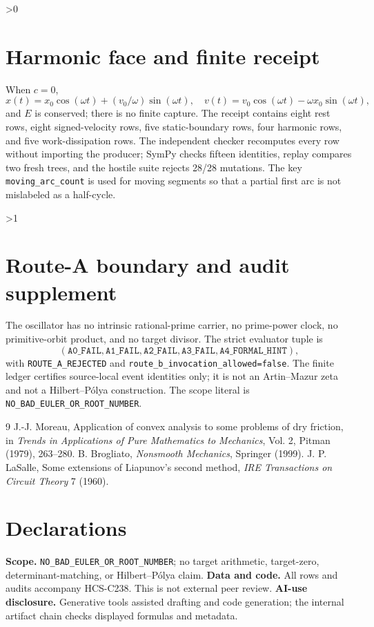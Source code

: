 \documentclass[10pt]{article}
\begin{document}
\ifnum\CRevisionRound>0
\section{Harmonic face and finite receipt}
When \(c=0\),
\[
 x(t)=x_0\cos(\omega t)+(v_0/\omega)\sin(\omega t),\quad
 v(t)=v_0\cos(\omega t)-\omega x_0\sin(\omega t),
\]
and \(E\) is conserved; there is no finite capture.  The receipt contains
eight rest rows, eight signed-velocity rows, five static-boundary rows, four
harmonic rows, and five work-dissipation rows.  The independent checker
recomputes every row without importing the producer; SymPy checks fifteen
identities, replay compares two fresh trees, and the hostile suite rejects
28/28 mutations.  The key \texttt{moving\_arc\_count} is used for moving
segments so that a
partial first arc is not mislabeled as a half-cycle.
\fi

\ifnum\CRevisionRound>1
\section{Route-A boundary and audit supplement}
The oscillator has no intrinsic rational-prime carrier, no prime-power clock,
no primitive-orbit product, and no target divisor.  The strict evaluator tuple
is
\[
(\mathtt{A0\_FAIL},\mathtt{A1\_FAIL},\mathtt{A2\_FAIL},
 \mathtt{A3\_FAIL},\mathtt{A4\_FORMAL\_HINT}),
\]
with \texttt{ROUTE\_A\_REJECTED} and
\texttt{route\_b\_invocation\_allowed=false}.  The finite ledger certifies
source-local event identities only; it is not an Artin--Mazur zeta and not a
Hilbert--Pólya construction.  The scope literal is
\texttt{NO\_BAD\_EULER\_OR\_ROOT\_NUMBER}.
\fi

\begin{thebibliography}{9}
 J.-J. Moreau, Application of convex analysis to some
problems of dry friction, in \emph{Trends in Applications of Pure Mathematics
to Mechanics}, Vol. 2, Pitman (1979), 263--280.
 B. Brogliato, \emph{Nonsmooth Mechanics}, Springer (1999).
 J. P. LaSalle, Some extensions of Liapunov's second method,
\emph{IRE Transactions on Circuit Theory} 7 (1960).
\end{thebibliography}

\section*{Declarations}
\textbf{Scope.} \texttt{NO\_BAD\_EULER\_OR\_ROOT\_NUMBER}; no target
arithmetic, target-zero, determinant-matching, or Hilbert--Pólya claim.
\textbf{Data and code.} All rows and audits accompany HCS-C238.  This is not
external peer review.
\textbf{AI-use disclosure.} Generative tools assisted drafting and code
generation; the internal artifact chain checks displayed formulas and metadata.
\end{document}
